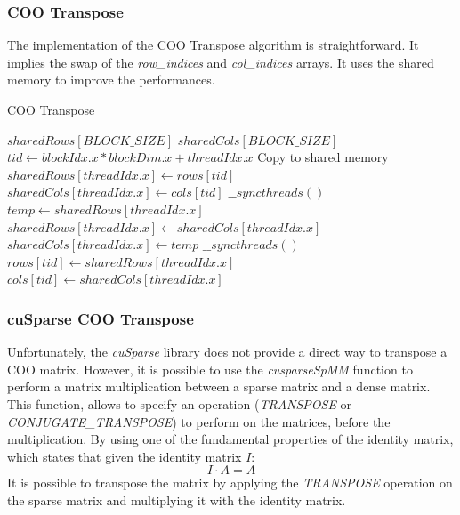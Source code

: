 \documentclass{IEEEconf}
\begin{document}
\subsubsection{COO Transpose} The implementation of the COO Transpose algorithm is straightforward. It implies the swap of 
the \textit{row\_indices} and \textit{col\_indices} arrays.
It uses the shared memory to improve the performances.
\begin{algorithm}
    \caption{COO Transpose}
    \begin{algorithmic}[1]
            \State $sharedRows[BLOCK\_SIZE]$
            \State $sharedCols[BLOCK\_SIZE]$
            \State $tid \gets blockIdx.x * blockDim.x + threadIdx.x$
                \Comment Copy to shared memory
                \State $sharedRows[threadIdx.x] \gets rows[tid]$
                \State $sharedCols[threadIdx.x] \gets cols[tid]$
                \State $\_\_syncthreads()$
                \State $temp \gets sharedRows[threadIdx.x]$
                \State $sharedRows[threadIdx.x] \gets sharedCols[threadIdx.x]$
                \State $sharedCols[threadIdx.x] \gets temp$
                \State $\_\_syncthreads()$
                \State $rows[tid] \gets sharedRows[threadIdx.x]$
                \State $cols[tid] \gets sharedCols[threadIdx.x]$
            \EndIf
        \EndProcedure
    \end{algorithmic}
\end{algorithm}
\subsubsection{cuSparse COO Transpose} Unfortunately, the \textit{cuSparse} library does not provide a direct way to
transpose a COO matrix. However, it is possible to use the \textit{cusparseSpMM} \cite{cusparse:spmm} function to perform a matrix multiplication
between a sparse matrix and a dense matrix. This function, allows to specify an operation (\textit{TRANSPOSE} or \textit{CONJUGATE\_TRANSPOSE})
to perform on the matrices, before the multiplication. By using one of the fundamental 
properties of the identity matrix, which states that given the identity matrix $I$: \\
\[
    I \cdot A = A 
\]
It is possible to transpose the matrix by applying the \textit{TRANSPOSE} operation on the sparse matrix and multiplying it with the identity matrix.
\end{document}
